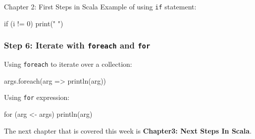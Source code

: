 \begin{notes}{Chapter 2: First Steps in Scala}
    Example of using \texttt{if} statement:

    \begin{highlight}
    \begin{code}[Scala]
    if (i != 0) print(" ")
    \end{code}
    \end{highlight}

    \subsubsection*{Step 6: Iterate with \texttt{foreach} and \texttt{for}}

    Using \texttt{foreach} to iterate over a collection:

    \begin{highlight}
    \begin{code}[Scala]
    args.foreach(arg => println(arg))
    \end{code}
    \end{highlight}

    Using \texttt{for} expression:

    \begin{highlight}
    \begin{code}[Scala]
    for (arg <- args) println(arg)
    \end{code}
    \end{highlight}
\end{notes}

The next chapter that is covered this week is \textbf{Chapter3: Next Steps In Scala}.

